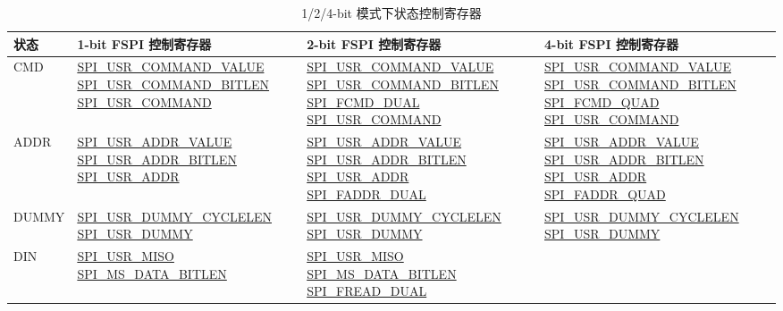 \documentclass[main\_\_CN.tex]{subfiles}
\begin{document}
\begin{longtable}[c]{ |L{1.3cm}|L{4.8cm}|L{4.8cm}|L{4.8cm}| }
\caption{1/2/4-bit 模式下状态控制寄存器}
\\\hline
{}
\textbf{状态} & \textbf{1-bit FSPI 控制寄存器}  & \textbf{2-bit FSPI 控制寄存器} & \textbf{4-bit FSPI 控制寄存器} \\
     \hline
\endhead
\label{tab:spi-usr1}
CMD  &\hyperref[fielddesc:SPIUSRCOMMANDVALUE]{SPI\_USR\_COMMAND\_VALUE}
     \hyperref[fielddesc:SPIUSRCOMMANDBITLEN]{SPI\_USR\_COMMAND\_BITLEN} \hyperref[fielddesc:SPIUSRCOMMAND]{SPI\_USR\_COMMAND}
     &\hyperref[fielddesc:SPIUSRCOMMANDVALUE]{SPI\_USR\_COMMAND\_VALUE} \hyperref[fielddesc:SPIUSRCOMMANDBITLEN]{SPI\_USR\_COMMAND\_BITLEN} \hyperref[fielddesc:SPIFCMDDUAL]{SPI\_FCMD\_DUAL}    \hyperref[fielddesc:SPIUSRCOMMAND]{SPI\_USR\_COMMAND} & \hyperref[fielddesc:SPIUSRCOMMANDVALUE]{SPI\_USR\_COMMAND\_VALUE} \hyperref[fielddesc:SPIUSRCOMMANDBITLEN]{SPI\_USR\_COMMAND\_BITLEN}  \hyperref[fielddesc:SPIFCMDQUAD]{SPI\_FCMD\_QUAD}   \hyperref[fielddesc:SPIUSRCOMMAND]{SPI\_USR\_COMMAND} \\
     \hline
ADDR &\hyperref[fielddesc:SPIUSRADDRVALUE]{SPI\_USR\_ADDR\_VALUE}
     \hyperref[fielddesc:SPIUSRADDRBITLEN]{SPI\_USR\_ADDR\_BITLEN}   \hyperref[fielddesc:SPIUSRADDR]{SPI\_USR\_ADDR}
     &\hyperref[fielddesc:SPIUSRADDRVALUE]{SPI\_USR\_ADDR\_VALUE}  \hyperref[fielddesc:SPIUSRADDRBITLEN]{SPI\_USR\_ADDR\_BITLEN}   \hyperref[fielddesc:SPIUSRADDR]{SPI\_USR\_ADDR}     \hyperref[fielddesc:SPIFADDRDUAL]{SPI\_FADDR\_DUAL} &
    \hyperref[fielddesc:SPIUSRADDRVALUE]{SPI\_USR\_ADDR\_VALUE}  \hyperref[fielddesc:SPIUSRADDRBITLEN]{SPI\_USR\_ADDR\_BITLEN}   \hyperref[fielddesc:SPIUSRADDR]{SPI\_USR\_ADDR}               \hyperref[fielddesc:SPIFADDRQUAD]{SPI\_FADDR\_QUAD} \\
     \hline
DUMMY&\hyperref[fielddesc:SPIUSRDUMMYCYCLELEN]{SPI\_USR\_DUMMY\_CYCLELEN}
     \hyperref[fielddesc:SPIUSRDUMMY]{SPI\_USR\_DUMMY}
     &\hyperref[fielddesc:SPIUSRDUMMYCYCLELEN]{SPI\_USR\_DUMMY\_CYCLELEN}    \hyperref[fielddesc:SPIUSRDUMMY]{SPI\_USR\_DUMMY} &
    \hyperref[fielddesc:SPIUSRDUMMYCYCLELEN]{SPI\_USR\_DUMMY\_CYCLELEN}    \hyperref[fielddesc:SPIUSRDUMMY]{SPI\_USR\_DUMMY}\\
     \hline
DIN  &\hyperref[fielddesc:SPIUSRMISO]{SPI\_USR\_MISO}
      \hyperref[fielddesc:SPIMSDATABITLEN]{SPI\_MS\_DATA\_BITLEN}
     &\hyperref[fielddesc:SPIUSRMISO]{SPI\_USR\_MISO}
     \hyperref[fielddesc:SPIMSDATABITLEN]{SPI\_MS\_DATA\_BITLEN}
    \hyperref[fielddesc:SPIFREADDUAL]{SPI\_FREAD\_DUAL}

\end{longtable}
\end{document}
